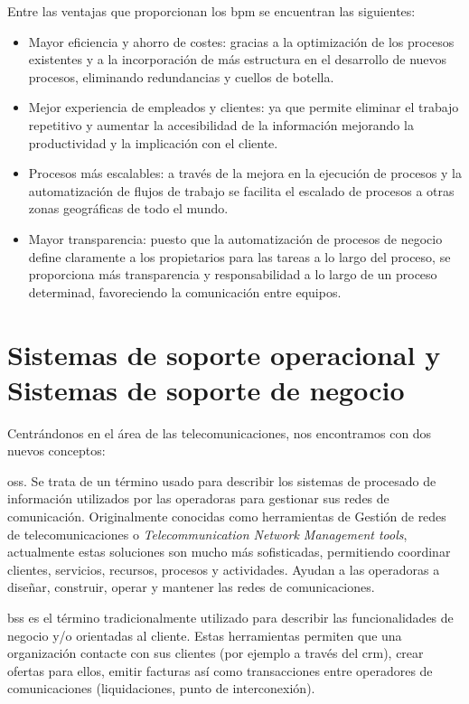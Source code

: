 Entre las ventajas que proporcionan los \acrshort{bpm} se encuentran las siguientes:
\begin{itemize}
\item Mayor eficiencia y ahorro de costes: gracias a la optimización de los procesos existentes y a la incorporación de más estructura en el desarrollo de nuevos procesos, eliminando redundancias y cuellos de botella.
\item Mejor experiencia de empleados y clientes: ya que permite eliminar el trabajo repetitivo y aumentar la accesibilidad de la información mejorando la productividad y la implicación con el cliente.
\item Procesos más escalables: a través de la mejora en la ejecución de procesos y la automatización de flujos de trabajo se facilita el escalado de procesos a otras zonas geográficas de todo el mundo.
\item Mayor transparencia: puesto que la automatización de procesos de negocio define claramente a los propietarios para las tareas a lo largo del proceso, se proporciona más transparencia y responsabilidad a lo largo de un proceso determinad, favoreciendo la comunicación entre equipos.
\end{itemize}




\section{Sistemas de soporte operacional y Sistemas de soporte de negocio}

Centrándonos en el área de las telecomunicaciones, nos encontramos con dos nuevos conceptos:


\acrfull{oss}. Se trata de un término usado para describir los sistemas de procesado de información utilizados por las operadoras para gestionar sus redes de comunicación. Originalmente conocidas como herramientas de Gestión de redes de telecomunicaciones o \emph{Telecommunication Network Management tools}, actualmente estas soluciones son mucho más sofisticadas, permitiendo coordinar clientes, servicios, recursos, procesos y actividades. Ayudan a las operadoras a diseñar, construir, operar y mantener las redes de comunicaciones.

\acrfull{bss} es el término tradicionalmente utilizado para describir las funcionalidades de negocio y/o orientadas al cliente. Estas herramientas  permiten que una organización contacte con sus clientes (por ejemplo a través del \acrshort{crm}), crear ofertas para ellos, emitir facturas así como transacciones entre operadores de comunicaciones (liquidaciones, punto de interconexión).

